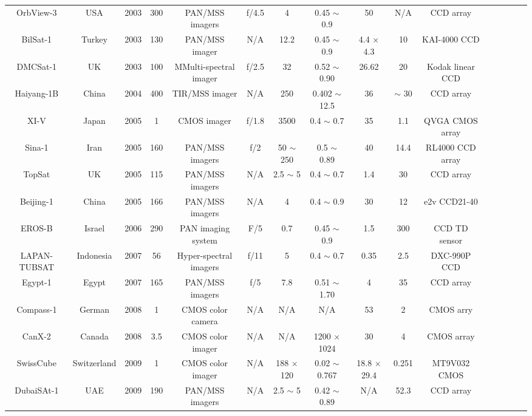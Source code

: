 \documentclass[final,5p,times,sort&compress,twocolumn]{elsarticle}
\begin{document}
\begin{table}
{\begin{tabular}{c c c c c c c c c c c c c c c c}
		    OrbView-3 & USA & 2003 & 300 & PAN/MSS imagers & f/4.5 & 4 & 0.45 $\sim$ 0.9 & 50 & N/A & CCD array & \cite{kramer2002observation}\\
		    BilSat-1 & Turkey & 2003 & 130 & PAN/MSS imager & N/A & 12.2 & 0.45 $\sim$ 0.9 &  4.4 $\times$ 4.3 & 10 &   KAI-4000 CCD & \cite{yuksel2005bilsat}\\
		    DMCSat-1 & UK & 2003 & 100 & MMulti-spectral imager &  f/2.5 & 32 & 0.52 $\sim$ 0.90 & 26.62 & 20 & Kodak linear CCD & \cite{eoportal}\\
		    Haiyang-1B & China & 2004 & 400 & TIR/MSS imager & N/A & 250 &  0.402 $\sim$ 12.5 & 36 & $\sim$ 30 & CCD array & \cite{eoportal}\\		
		    XI-V & Japan & 2005 & 1 & CMOS imager  & f/1.8 & 3500 & 0.4 $\sim$ 0.7 &  35 & 1.1 &  QVGA CMOS array & \cite{ FUNASE2007707}\\		     	
		    Sina-1 & Iran & 2005 & 160 & PAN/MSS imagers & f/2 & 50 $\sim$ 250 & 0.5 $\sim$ 0.89 &  40 &14.4 &  RL4000 CCD array & \cite{abolghasemi2012design}\\     
		    TopSat & UK & 2005 & 115 & PAN/MSS imagers & N/A & 2.5 $\sim$ 5 & 0.4 $\sim$ 0.7 &  1.4 & 30  & CCD array & \cite{price2002topsat}\\
		    Beijing-1 & China & 2005 & 166 & PAN/MSS imagers &   N/A & 4 & 0.4 $\sim$ 0.9 &  30 & 12 & e2v CCD21-40 & \cite{da2006small}\\ 
		    EROS-B & Israel & 2006 & 290 & PAN imaging system & F/5 & 0.7 & 0.45 $\sim$ 0.9 &  1.5 & 300 & CCD TD sensor & \cite{eoportal}\\		
		    LAPAN-TUBSAT & Indonesia & 2007 & 56 & Hyper-spectral imagers & f/11 & 5 & 0.4 $\sim$ 0.7 &  0.35 & 2.5 & DXC-990P CCD & \cite{hardhienata2007lapan} \\
		    Egypt-1 & Egypt & 2007 & 165 & PAN/MSS imagers & f/5 & 7.8 & 0.51 $\sim$ 1.70 & 4 & 35 &  CCD array & \cite{metwalli2012combining}\\
		    Compass-1 & German & 2008 & 1 & CMOS color camera & N/A & N/A & N/A & 53 & 2 &   CMOS arry & \cite{scholz2009flight}\\	
		    CanX-2 & Canada & 2008 & 3.5 & CMOS color imager & N/A & N/A & 1200 $\times$ 1024 & 30 & 4 & CMOS array & \cite{ rankin2005canx}\\		    	   
		    SwissCube & Switzerland & 2009 & 1 & CMOS color imager & N/A & 188 $\times$ 120 & 0.02 $\sim$ 0.767 & 18.8 $\times$ 29.4 & 0.251 &  MT9V032 CMOS & \cite{noca2009lessons}\\		
		    DubaiSAt-1 & UAE & 2009 & 190 & PAN/MSS imagers & N/A & 2.5 $\sim$ 5 & 0.42 $\sim$ 0.89 &  N/A &  52.3 & CCD array & \cite{al2009dubaisat}\\		

\end{tabular}}
\end{table}
\end{document}

